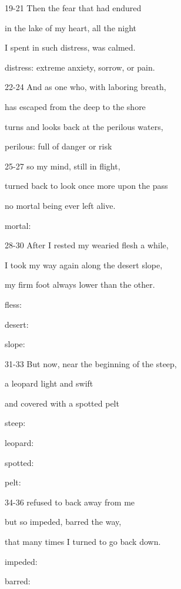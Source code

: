 \documentclass[oneside]{ctexbook}
\begin{document}
\begin{mytext}{19-21}
Then the fear that had endured

in the lake of my heart, all the night

I spent in such distress, was calmed.

\tcblower

distress: extreme anxiety, sorrow, or pain.
\end{mytext}

\begin{mytext}{22-24}
And as one who, with laboring breath,

has escaped from the deep to the shore

turns and looks back at the perilous waters,

\tcblower

perilous: full of danger or risk
\end{mytext}

\begin{mytext}{25-27}
so my mind, still in flight,

turned back to look once more upon the pass

no mortal being ever left alive.

\tcblower

mortal: 
\end{mytext}

\begin{mytext}{28-30}
After I rested my wearied flesh a while,

I took my way again along the desert slope,

my firm foot always lower than the other.

\tcblower

fless:

desert:

slope:
\end{mytext}

\begin{mytext}{31-33}
But now, near the beginning of the steep,

a leopard light and swift

and covered with a spotted pelt

\tcblower

steep:

leopard:

spotted:

pelt:
\end{mytext}

\begin{mytext}{34-36}
refused to back away from me

but so impeded, barred the way,

that many times I turned to go back down.

\tcblower

impeded:

barred:
\end{mytext}
\end{document}

